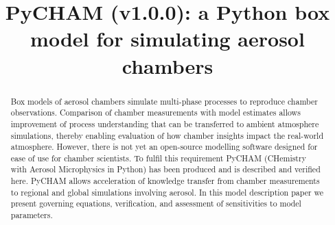 \documentclass[gmd, manuscript]{copernicus}
\begin{document}
\title{PyCHAM (v1.0.0): a Python box model for simulating aerosol chambers}















\received{}
\pubdiscuss{} %
\revised{}
\accepted{}
\published{}




\maketitle



\begin{abstract}
Box models of aerosol chambers simulate multi-phase processes to reproduce chamber observations.  Comparison of chamber measurements with model estimates allows improvement of process understanding that can be transferred to ambient atmosphere simulations, thereby enabling evaluation of how chamber insights impact the real-world atmosphere.  However, there is not yet an open-source modelling software designed for ease of use for chamber scientists.  To fulfil this requirement PyCHAM (CHemistry with Aerosol Microphysics in Python) has been produced and is described and verified here.  PyCHAM allows acceleration of knowledge transfer from chamber measurements to regional and global simulations involving aerosol.  In this model description paper we present governing equations, verification, and assessment of sensitivities to model parameters.

\end{abstract}
\end{document}
